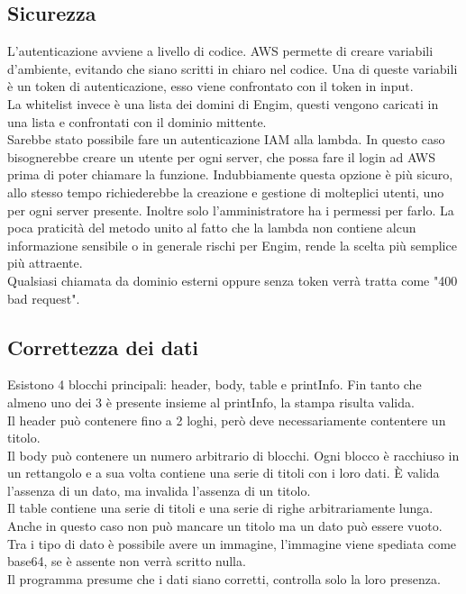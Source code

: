 \documentclass[12pt]{article}
\begin{document}
\subsection{Sicurezza}
L'autenticazione avviene a livello di codice. AWS permette di creare variabili
d'ambiente, evitando che siano scritti in chiaro nel codice. Una di queste variabili 
è un token di autenticazione, esso viene confrontato con il token in input. 
\\ La whitelist invece è una lista dei domini di Engim, questi vengono caricati in 
una lista e confrontati con il dominio mittente. 
\\ Sarebbe stato possibile fare un autenticazione IAM alla lambda. In questo caso 
bisognerebbe creare un utente per ogni server, che possa fare il login ad AWS prima 
di poter chiamare la funzione. Indubbiamente questa opzione è più sicuro, allo stesso 
tempo richiederebbe la creazione e gestione di molteplici utenti, uno per ogni server 
presente. Inoltre solo l'amministratore ha i permessi per farlo. La poca praticità 
del metodo unito al fatto che la lambda non contiene alcun informazione sensibile 
o in generale rischi per Engim, rende la scelta più semplice più attraente.
\\ Qualsiasi chiamata da dominio esterni oppure senza token verrà tratta come 
"400 bad request". 

\subsection{Correttezza dei dati}
Esistono 4 blocchi principali: header, body, table e printInfo. 
Fin tanto che almeno uno dei 3 è presente insieme al printInfo, 
la stampa risulta valida.
\\ Il header può contenere fino a 2 loghi, però deve necessariamente contentere 
un titolo. 
\\ Il body può contenere un numero arbitrario di blocchi. Ogni blocco è racchiuso 
in un rettangolo e a sua volta contiene una serie di titoli con i loro dati. 
È valida l'assenza di un dato, ma invalida l'assenza di un titolo. 
\\ Il table contiene una serie di titoli e una serie di righe arbitrariamente lunga. 
Anche in questo caso non può mancare un titolo ma un dato può essere vuoto. 
Tra i tipo di dato è possibile avere un immagine, l'immagine viene spediata come 
base64, se è assente non verrà scritto nulla. 
\\ Il programma presume che i dati siano corretti, controlla solo la loro presenza.
\end{document}
